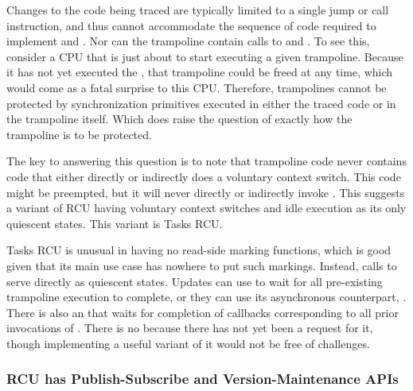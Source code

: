 Changes to the code being traced are typically limited to a single jump
or call instruction, and thus cannot accommodate the sequence of code
required to implement  and .
Nor can the trampoline contain calls to  and
.
To see this, consider a CPU that is just about to start executing a
given trampoline.
Because it has not yet executed the , that
trampoline could be freed at any time, which would come as a fatal
surprise to this CPU.
Therefore, trampolines cannot be protected by synchronization primitives
executed in either the traced code or in the trampoline itself.
Which does raise the question of exactly how the trampoline is to be
protected.

The key to answering this question is to note that trampoline code
never contains code that either directly or indirectly does a
voluntary context switch.
This code might be preempted, but it will never directly or indirectly
invoke .
This suggests a variant of RCU having voluntary context switches and
idle execution as its only quiescent states.
This variant is Tasks RCU.

Tasks RCU is unusual in having no read-side marking functions, which
is good given that its main use case has nowhere to put such markings.
Instead, calls to  serve directly as quiescent states.
Updates can use  to wait for all pre-existing
trampoline execution to complete, or they can use its asynchronous
counterpart, .
There is also an  that waits for completion
of callbacks corresponding to all prior invocations of .
There is no  because there has
not yet been a request for it, though implementing a useful variant of
it would not be free of challenges.

\QuickQuizEnd

\subsubsection{RCU has Publish-Subscribe and Version-Maintenance APIs}
\label{sec:defer:RCU has Publish-Subscribe and Version-Maintenance APIs}

